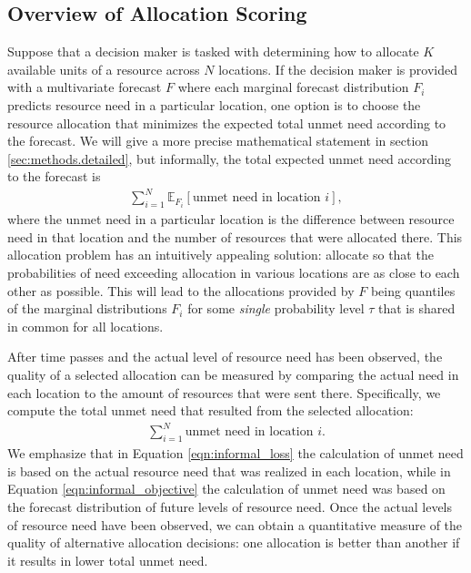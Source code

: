 \documentclass{article}\usepackage[]{graphicx}\usepackage[]{xcolor}
\begin{document}
\subsection{Overview of Allocation Scoring}
\label{sec:methods.overview}

Suppose that a decision maker is tasked with determining how to allocate $K$ available units of a resource across $N$ locations.
If the decision maker is provided with a multivariate forecast $F$ where each marginal forecast distribution $F_i$ predicts resource need in a particular location, one option is to choose the resource allocation that minimizes the expected total unmet need according to the forecast.
We will give a more precise mathematical statement in section \ref{sec:methods.detailed}, but informally, the total expected unmet need according to the forecast is
\begin{align}
\sum_{i=1}^N \mathbb{E}_{F_i}[\text{unmet need in location $i$}], \label{eqn:informal_objective}
\end{align}
where the unmet need in a particular location is the difference between resource need in that location and the number of resources that were allocated there.
This allocation problem has an intuitively appealing solution: allocate so that the probabilities of need exceeding allocation in various locations are as close to each other as possible.
This will lead to the allocations provided by $F$ being quantiles of the marginal distributions $F_i$ for some \emph{single} probability level $\tau$ that is shared in common for all locations.

After time passes and the actual level of resource need has been observed, the quality of a selected allocation can be measured by comparing the actual need in each location to the amount of resources that were sent there. Specifically, we compute the total unmet need that resulted from the selected allocation:
\begin{align}
    \sum_{i=1}^N \text{unmet need in location $i$}. \label{eqn:informal_loss}
\end{align}
We emphasize that in Equation \eqref{eqn:informal_loss} the calculation of unmet need is based on the actual resource need that was realized in each location, while in Equation \eqref{eqn:informal_objective} the calculation of unmet need was based on the forecast distribution of future levels of resource need.
Once the actual levels of resource need have been observed, we can obtain a quantitative measure of the quality of alternative allocation decisions: one allocation is better than another if it results in lower total unmet need.
\end{document}
